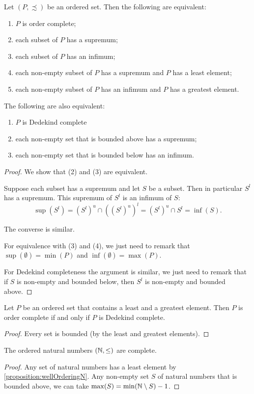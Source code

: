\begin{proposition} \label{existenceSupremaInfima}
Let $(P,\precsim)$ be an ordered set. Then the following are equivalent:
\begin{enumerate}
\item $P$ is order complete;
\item each subset of $P$ has a supremum;
\item each subset of $P$ has an infimum;
\item each non-empty subset of $P$ has a supremum and $P$ has a least element;
\item each non-empty subset of $P$ has an infimum and $P$ has a greatest element.
\end{enumerate}
The following are also equivalent:
\begin{enumerate}
\item $P$ is Dedekind complete
\item each non-empty set that is bounded above has a supremum;
\item each non-empty set that is bounded below has an infimum.
\end{enumerate}
\end{proposition}
\begin{proof}
We show that (2) and (3) are equivalent.

Suppose each subset has a supremum and let $S$ be a subset. Then in particular $S^l$ has a supremum. This supremum of $S^l$ is an infimum of $S$:
\[ \sup(S^l) = (S^l)^u\cap((S^l)^u)^l = (S^l)^u\cap S^l = \inf(S).  \]

The converse is similar.

For equivalence with (3) and (4), we just need to remark that $\sup(\emptyset) = \min(P)$ and $\inf(\emptyset) = \max(P)$.

For Dedekind completeness the argument is similar, we just need to remark that if $S$ is non-empty and bounded below, then $S^l$ is non-empty and bounded above.
\end{proof}

\begin{lemma}
Let $P$ be an ordered set that contains a least and a greatest element. Then $P$ is order complete \textup{if and only if} $P$ is Dedekind complete.
\end{lemma}
\begin{proof}
Every set is bounded (by the least and greatest elements).
\end{proof}

\begin{lemma}
The ordered natural numbers $\left( \mathbb{N},\leq \right)$ are complete.
\end{lemma}
\begin{proof}
Any set of natural numbers has a least element by \ref{proposition:wellOrderingN}. Any non-empty set $S$ of natural numbers that is bounded above, we can take $\max(S) = \min(\mathbb{N}\setminus S)-1$.
\end{proof}

